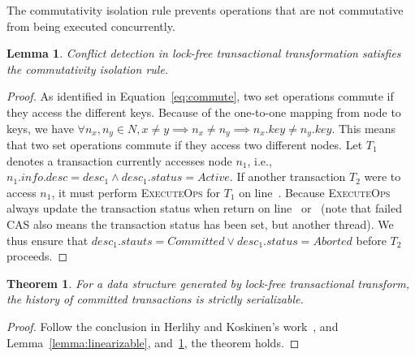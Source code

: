 \documentclass[]{sig-alternate-05-2015}
\newtheorem{theorem}{Theorem}
\newtheorem{lemma}{Lemma}
\begin{document}
The commutativity isolation rule prevents operations that are not commutative from being executed concurrently.
\begin{lemma}
    \label{lemma:commute}
    Conflict detection in lock-free transactional transformation satisfies the commutativity isolation rule.
\end{lemma}
\begin{proof}
    As identified in Equation~\ref{eq:commute}, two set operations commute if they access the different keys.
    Because of the one-to-one mapping from node to keys, we have $\forall n_x,n_y \in N, x \ne y \implies n_x \ne n_y \implies n_x.key \ne n_y.key$. 
    This means that two set operations commute if they access two different nodes.
    Let $T_1$ denotes a transaction currently accesses node $n_1$, i.e., $n_1.info.desc = desc_1 \land desc_1.status = Active$.
    If another transaction $T_2$ were to access $n_1$, it must perform \textsc{ExecuteOps} for $T_1$ on line~.
    Because \textsc{ExecuteOps} always update the transaction status when return on line~ or~ (note that failed CAS also means the transaction status has been set, but another thread).
    We thus ensure that $desc_1.stauts = Committed \lor desc_1.status = Aborted$ before $T_2$ proceeds. 
\end{proof}

\begin{theorem}
    For a data structure generated by lock-free transactional transform, the history of committed transactions is strictly serializable.
\end{theorem}
\begin{proof}
Follow the conclusion in Herlihy and Koskinen's work~\cite{herlihy2008transactional}, and Lemma~\ref{lemma:linearizable}, and~\ref{lemma:commute}, the theorem holds.
\end{proof}
\end{document}
